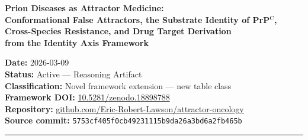 \documentclass[12pt,a4paper]{article}
\newcommand{\prpc}{PrP$^{\mathrm{C}}$}
\begin{document}
\begin{titlepage}
\vspace*{2cm}
{\LARGE\bfseries Prion Diseases as Attractor Medicine:\\[0.5em]
\large Conformational False Attractors, the Substrate Identity of \prpc{},\\
Cross-Species Resistance, and Drug Target Derivation\\
from the Identity Axis Framework}

\vspace{1.5em}

\author[1]{Eric Robert Lawson}

\vspace{1.5em}

\noindent\textbf{Date:} 2026-03-09\\
\textbf{Status:} Active --- Reasoning Artifact\\
\textbf{Classification:} Novel framework extension --- new table class\\
\textbf{Framework DOI:} \href{https://doi.org/10.5281/zenodo.18898788}{10.5281/zenodo.18898788}\\
\textbf{Repository:} \href{https://github.com/Eric-Robert-Lawson/attractor-oncology}{github.com/Eric-Robert-Lawson/attractor-oncology}\\
\textbf{Source commit:} \texttt{5753cf405f0cb49231115b9da26a3bd6a2fb465b}

\vspace{1.5em}

\noindent\rule{\textwidth}{0.8pt}

\begin{abstract}
\noindent
The Identity Axis Framework defines biological identity maintenance through
the ratio $R = A/H$, where $A$ is the anchoring signal (Identity Anchor) and
$H$ is the dissolving pressure (Convergence Hub). Disease arises when $R$ falls
below threshold and the system enters a false attractor --- a coherent,
self-maintaining state that is structurally wrong. Previous applications of
this framework to cancer, neurodegeneration, and psychiatric disease have
operated at the level of the cell, where the unit of identity failure is a
gene regulatory network attractor. This paper extends the framework to prion
diseases and establishes a new table class: the \textit{protein conformational
false attractor} (Class~2, Level~4), in which the unit of identity failure is
a single protein molecule.


\end{abstract}
\end{titlepage}
\end{document}
